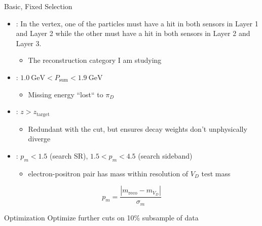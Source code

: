 \documentclass[aspectratio=169]{beamer}
\begin{document}

\begin{frame}{Basic, Fixed Selection}
  \begin{itemize}
    \item {}: In the vertex, one of the particles 
      must have a hit in both sensors in Layer 1 and Layer 2
      while the other must have a hit in both sensors in Layer 2 and Layer 3.
      \begin{itemize}
        \item The reconstruction category I am studying
      \end{itemize}
    \item {}:
      $\qty{1.0}{\GeV} < P_\mathrm{sum} < \qty{1.9}{\GeV}$
      \begin{itemize}
        \item Missing energy ``lost`` to $\pi_D$
      \end{itemize}
    \item {}: $z > z_\mathrm{target}$
      \begin{itemize}
        \item Redundant with the \minyzero cut, but ensures decay weights
          don't unphysically diverge
      \end{itemize}
    \item {}: $p_m < 1.5$ (search SR),
      $1.5 < p_m < 4.5$ (search sideband)
      \begin{itemize}
        \item electron-positron pair has mass within resolution of $V_D$ test mass
      \end{itemize}
  \end{itemize}
  $$
    p_m = \frac{|m_\mathrm{reco}-m_{V_D}|}{\sigma_m}
  $$

  \begin{block}{Optimization}
    Optimize further cuts on 10\% subsample of data
  \end{block}
\end{frame}
\end{document}
